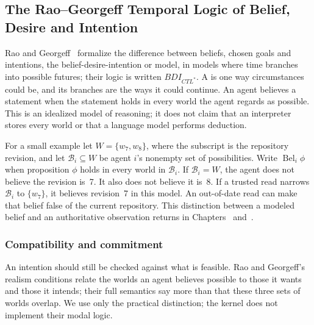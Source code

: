 \subsection{The Rao--Georgeff Temporal Logic of Belief, Desire and Intention}

Rao and Georgeff~ formalize the difference
between beliefs, chosen goals and intentions, the belief-desire-intention or
 model, in models where time branches into possible futures; their
logic is written $BDI_{CTL^*}$. A  is one way circumstances could
be, and its branches are the ways it could continue. An agent believes a
statement when the statement holds in every world the agent regards as
possible. This is an idealized model of reasoning; it does not claim that an
interpreter stores every world or that a language model performs deduction.

For a small example let $W=\{w_7,w_8\}$, where the subscript is the repository
revision, and let $\mathcal B_i\subseteq W$ be agent $i$'s nonempty set of possibilities.
Write $\operatorname{Bel}_i\phi$ when proposition $\phi$ holds in every world
in $\mathcal B_i$. If $\mathcal B_i=W$, the agent does not believe the revision is~7. It also does
not believe it is~8. If a trusted read narrows $\mathcal B_i$ to $\{w_7\}$, it believes
revision~7 in this model. An out-of-date read can make that belief false of the current
repository. This distinction between a modeled belief and an authoritative
observation returns in Chapters~ and~.

\subsubsection{Compatibility and commitment}
An intention should still be checked against what is feasible. Rao and
Georgeff's realism conditions relate the worlds an agent believes possible to
those it wants and those it intends; their full semantics say more than that
these three sets of worlds overlap. We use only the practical distinction; the kernel does not
implement their modal logic.

